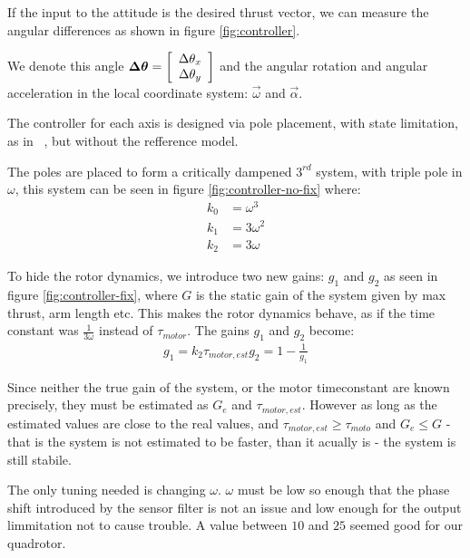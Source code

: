 If the input to the attitude is the desired thrust vector, we can measure the
angular differences as shown in figure \ref{fig:controller}.

We denote this angle $\vec{\Delta\theta} = \matrix{c}{}{}{ \Delta \theta_x \\
\Delta\theta_y}$ and the angular rotation and angular acceleration
in the local coordinate system: $\vec\omega$ and $\vec\alpha$.


The controller for each axis is designed via pole placement, with state
limitation, as in~\cite{WangWang} 
, but without the refference model.

The poles are placed to form a critically dampened $3^{rd}$ system, with triple
pole in $\omega$, this system can be seen in figure \ref{fig:controller-no-fix}
where:
\begin{align}
k_0 & = \omega^3\\
k_1 & = 3\omega^2\\
k_2 & = 3\omega
\end{align}


To hide the rotor dynamics, we introduce two new gains: $g_1$ and $g_2$ as seen
in figure \ref{fig:controller-fix}, where $G$ is the static gain of the system
given by max thrust, arm length etc.
This makes the rotor dynamics behave, as if the time constant was $\frac{1}{3\omega}$ instead of $\tau_{motor}$.
The gains $g_1$ and $g_2$ become:
\begin{align}
g_1 = k_2 \tau_{motor,est}
g_2 =1 - \frac{1}{g_1}
\end{align}


Since neither the true gain of the system, or the motor timeconstant are known
precisely, they must be estimated as $G_e$ and $\tau_{motor,est}$. However as long
as the estimated values are close to the real values, and $\tau_{motor,est} \geq
\tau_{moto}$ and $G_e \leq G$ - that is the system is not estimated to be
faster, than it acually is - the system is still stabile. %

The only tuning needed is changing $\omega$. $\omega$ must be low so enough that
the phase shift introduced by the sensor filter is not an issue and low enough
for the output limmitation not to cause trouble. A value between $10$ and $25$
seemed good for our quadrotor.

